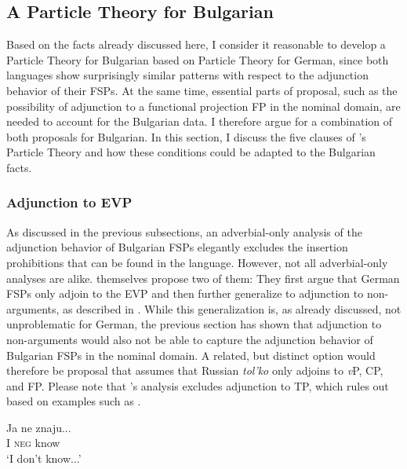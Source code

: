 \documentclass[output=paper,colorlinks,citecolor=brown]{langscibook}
\begin{document}
\subsection{A Particle Theory for Bulgarian}\label{sec:3.3}
Based on the facts already discussed here, I consider it reasonable to develop a Particle Theory for Bulgarian based on  Particle Theory for German, since both languages show surprisingly similar patterns with respect to the adjunction behavior of their FSPs. At the same time, essential parts of  proposal, such as the possibility of adjunction to a functional projection FP in the nominal domain, are needed to account for the Bulgarian data. I therefore argue for a combination of both proposals for Bulgarian. In this section, I discuss the five clauses of \citeauthor{BuringHartmann2001}'s Particle Theory and how these conditions could be adapted to the Bulgarian facts. 
\subsubsection{Adjunction to EVP}\label{sec:3.3.1}
As discussed in the previous subsections, an adverbial-only analysis of the adjunction behavior of Bulgarian FSPs elegantly excludes the insertion prohibitions that can be found in the language. However, not all adverbial-only analyses are alike. \citet{BuringHartmann2001} themselves propose two of them: They first argue that German FSPs only adjoin to the EVP and then further generalize to adjunction to non-arguments, as described in . While this generalization is, as already discussed, not unproblematic for German, the previous section has shown that adjunction to non-arguments would also not be able to capture the adjunction behavior of Bulgarian FSPs in the nominal domain. A related, but distinct option would therefore be  proposal that assumes that Russian \textit{tol'ko} only adjoins to \textit{v}P, CP, and FP. Please note that \citeauthor{Zanon2018}'s analysis excludes adjunction to TP, which \citeauthor{Zanon2018} rules out based on examples such as .

\ea\label{TPdata:1} 
\gll Ja ne znaju...\\ 
I \textsc{neg} know \\ 
\glt `I don't know...' \\
\label{TPdata:1a}
\label{TPdata:1b}
\z
\z   
\end{document}
